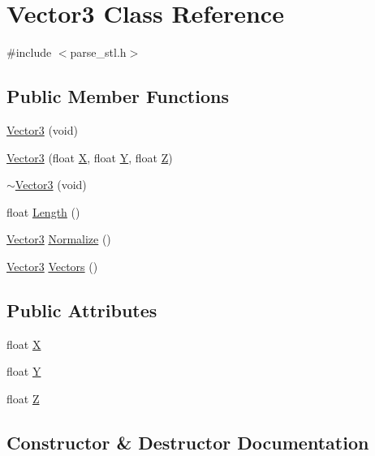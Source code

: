 \hypertarget{classVector3}{}\section{Vector3 Class Reference}
\label{classVector3}


{\ttfamily \#include $<$parse\+\_\+stl.\+h$>$}

\subsection*{Public Member Functions}
\begin{DoxyCompactItemize}
\item 
\mbox{\hyperlink{classVector3_a020d62af9911f9f174a3f2adbace2270}{Vector3}} (void)
\item 
\mbox{\hyperlink{classVector3_a139c27d257255f372ff858b1b51f0ccc}{Vector3}} (float \mbox{\hyperlink{classVector3_a37198537fb3a99b029e12632a1632b00}{X}}, float \mbox{\hyperlink{classVector3_a946530ae3177de1a94c10f0ffece365b}{Y}}, float \mbox{\hyperlink{classVector3_a78d01dc0845b9f17b51c972effdc495a}{Z}})
\item 
\mbox{\hyperlink{classVector3_a17fc19421d16ac167d99766aa167a9a3}{$\sim$\+Vector3}} (void)
\item 
float \mbox{\hyperlink{classVector3_ae5218ba9e630cc051924d1b3b66d9c62}{Length}} ()
\item 
\mbox{\hyperlink{classVector3}{Vector3}} \mbox{\hyperlink{classVector3_a8a8cb236aae8602af246f4f56495f159}{Normalize}} ()
\item 
\mbox{\hyperlink{classVector3}{Vector3}} \mbox{\hyperlink{classVector3_a49f4cb08ee79bc184e46101133f5ba4b}{Vectors}} ()
\end{DoxyCompactItemize}
\subsection*{Public Attributes}
\begin{DoxyCompactItemize}
\item 
float \mbox{\hyperlink{classVector3_a37198537fb3a99b029e12632a1632b00}{X}}
\item 
float \mbox{\hyperlink{classVector3_a946530ae3177de1a94c10f0ffece365b}{Y}}
\item 
float \mbox{\hyperlink{classVector3_a78d01dc0845b9f17b51c972effdc495a}{Z}}
\end{DoxyCompactItemize}


\subsection{Constructor \& Destructor Documentation}
\mbox{\label{classVector3_a020d62af9911f9f174a3f2adbace2270}} 
